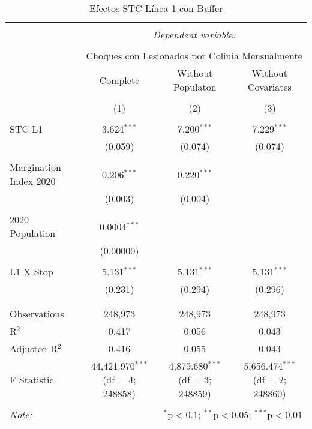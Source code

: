 
\begin{table}[!htbp] \centering 
  \caption{Efectos STC Línea 1 con Buffer} 
  \label{} 
\begin{tabular}{@{\extracolsep{5pt}}lccc} 
\\[-1.8ex]\hline 
\hline \\[-1.8ex] 
 & \multicolumn{3}{c}{\textit{Dependent variable:}} \\ 
\cline{2-4} 
\\[-1.8ex] & \multicolumn{3}{c}{Choques con Lesionados por Colinia Mensualmente} \\ 
 & Complete & Without Populaton & Without Covariates \\ 
\\[-1.8ex] & (1) & (2) & (3)\\ 
\hline \\[-1.8ex] 
 STC L1 & 3.624$^{***}$ & 7.200$^{***}$ & 7.229$^{***}$ \\ 
  & (0.059) & (0.074) & (0.074) \\ 
  & & & \\ 
 Margination Index 2020 & 0.206$^{***}$ & 0.220$^{***}$ &  \\ 
  & (0.003) & (0.004) &  \\ 
  & & & \\ 
 2020 Population & 0.0004$^{***}$ &  &  \\ 
  & (0.00000) &  &  \\ 
  & & & \\ 
 L1 X Stop & 5.131$^{***}$ & 5.131$^{***}$ & 5.131$^{***}$ \\ 
  & (0.231) & (0.294) & (0.296) \\ 
  & & & \\ 
\hline \\[-1.8ex] 
Observations & 248,973 & 248,973 & 248,973 \\ 
R$^{2}$ & 0.417 & 0.056 & 0.043 \\ 
Adjusted R$^{2}$ & 0.416 & 0.055 & 0.043 \\ 
F Statistic & 44,421.970$^{***}$ (df = 4; 248858) & 4,879.680$^{***}$ (df = 3; 248859) & 5,656.474$^{***}$ (df = 2; 248860) \\ 
\hline 
\hline \\[-1.8ex] 
\textit{Note:}  & \multicolumn{3}{r}{$^{*}$p$<$0.1; $^{**}$p$<$0.05; $^{***}$p$<$0.01} \\ 
\end{tabular} 
\end{table} 
